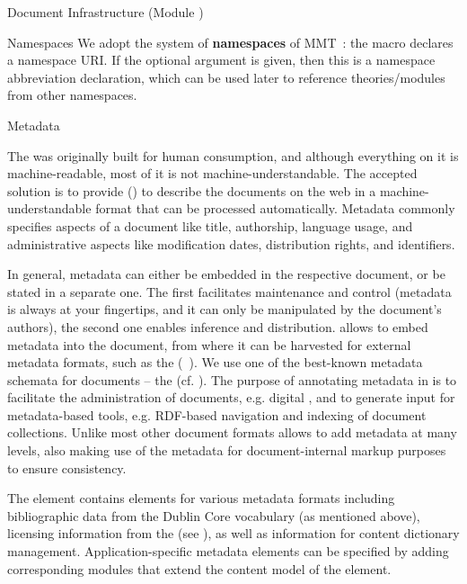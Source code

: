 \begin{tchapter}[id=omdoc-infrastructure,short=Document Infrastructure]{Document Infrastructure (Module )}
{\begin{tesction}[id=namespace]{Namespaces}
  We adopt the system of \textbf{namespaces} of MMT~\cite{MMT:namespaces:on}: the
   macro declares a namespace URI. If the optional argument is given,
  then this is a namespace abbreviation declaration, which can be used later to reference
  theories/modules from other namespaces.
\end{tesction}

\begin{tsection}[id=metadata]{Metadata}
  
  The  was originally built for human consumption, and although everything
  on it is machine-readable, most of it is not machine-understandable.  The accepted
  solution is to provide  () to describe
  the documents on the web in a machine-understandable format that can be processed
  automatically. Metadata commonly specifies aspects of a document like title, authorship,
  language usage, and administrative aspects like modification dates, distribution rights,
  and identifiers.
  
  In general, metadata can either be embedded in the respective document, or be stated in
  a separate one. The first facilitates maintenance and control (metadata is always at
  your fingertips, and it can only be manipulated by the document's authors), the second
  one enables inference and distribution. \omdoc allows to embed metadata into the
  document, from where it can be harvested for external metadata formats, such as the
  {\xml} {}
  ({\rdf}~\cite{LasSwi:rdf99}).  We use one of the best-known metadata schemata for
  documents -- the  (cf.  ). The
  purpose of annotating metadata in \omdoc is to facilitate the administration of
  documents, e.g.  digital , and to generate input for
  metadata-based tools, e.g.  RDF-based navigation and indexing of document collections.
  Unlike most other document formats \omdoc allows to add metadata at many levels, also
  making use of the metadata for document-internal markup purposes to ensure consistency.
  
  The  element contains elements for various metadata formats including
  bibliographic data from the Dublin Core vocabulary (as mentioned above), licensing
  information from the  (see
  ), as well as information for {\openmath} content dictionary
  management. Application-specific metadata elements can be specified by adding
  corresponding \omdoc modules that extend the content model of the {}
  element.


\end{tsection}}
\end{tchapter}
